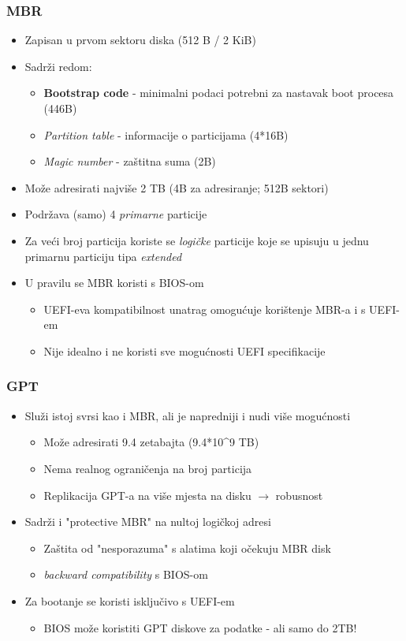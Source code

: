 \documentclass[t]{beamer}
\begin{document}
\begin{frame}
	\frametitle{MBR}
	\begin{itemize}
		\item Zapisan u prvom sektoru diska (512 B / 2 KiB)
		\item Sadrži redom:
		\begin{itemize}
			\item \textbf{Bootstrap code} - minimalni podaci potrebni za nastavak boot procesa (446B)
			\item \textit{Partition table} - informacije o particijama (4*16B)
			\item \textit{Magic number} - zaštitna suma (2B)
		\end{itemize}
		\item Može adresirati najviše 2 TB (4B za adresiranje; 512B sektori)
		\item Podržava (samo) 4 \emph{primarne} particije
		\item Za veći broj particija koriste se \emph{logičke} particije koje se upisuju u jednu primarnu particiju tipa \emph{extended}
		\item U pravilu se MBR koristi s BIOS-om
		\begin{itemize}
			\item UEFI-eva kompatibilnost unatrag omogućuje korištenje MBR-a i s UEFI-em
			\item Nije idealno i ne koristi sve mogućnosti UEFI specifikacije
		\end{itemize}
	\end{itemize}
\end{frame}

\begin{frame}
	\frametitle{GPT}
	\begin{itemize}
		\item Služi istoj svrsi kao i MBR, ali je napredniji i nudi više mogućnosti
		\begin{itemize}
			\item Može adresirati 9.4 zetabajta (9.4*10\textasciicircum9 TB)
			\item Nema realnog ograničenja na broj particija
			\item Replikacija GPT-a na više mjesta na disku $\longrightarrow$ robusnost
		\end{itemize}
		\item Sadrži i "protective MBR" na nultoj logičkoj adresi
		\begin{itemize}
			\item Zaštita od "nesporazuma" s alatima koji očekuju MBR disk
			\item \textit{backward compatibility} s BIOS-om
		\end{itemize}
		\item Za bootanje se koristi isključivo s UEFI-em
		\begin{itemize}
			\item BIOS može koristiti GPT diskove za podatke - ali samo do 2TB!
		\end{itemize}
	\end{itemize}
\end{frame}
\end{document}
